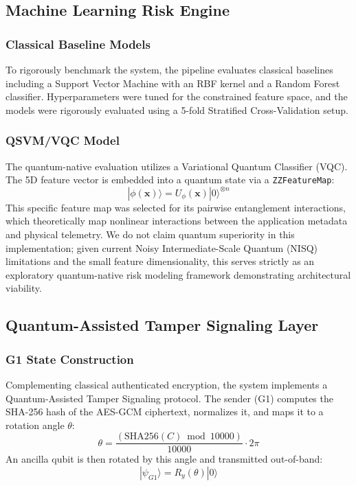 \subsection{Machine Learning Risk Engine}

\subsubsection{Classical Baseline Models}
To rigorously benchmark the system, the pipeline evaluates classical baselines including a Support Vector Machine with an RBF kernel and a Random Forest classifier. Hyperparameters were tuned for the constrained feature space, and the models were rigorously evaluated using a 5-fold Stratified Cross-Validation setup.

\subsubsection{QSVM/VQC Model}
The quantum-native evaluation utilizes a Variational Quantum Classifier (VQC). The 5D feature vector is embedded into a quantum state via a \texttt{ZZFeatureMap}:
\begin{equation}
|\phi(\mathbf{x})\rangle = U_\phi(\mathbf{x})|0\rangle^{\otimes n}
\end{equation}
This specific feature map was selected for its pairwise entanglement interactions, which theoretically map nonlinear interactions between the application metadata and physical telemetry. We do not claim quantum superiority in this implementation; given current Noisy Intermediate-Scale Quantum (NISQ) limitations and the small feature dimensionality, this serves strictly as an exploratory quantum-native risk modeling framework demonstrating architectural viability.

\subsection{Quantum-Assisted Tamper Signaling Layer}

\subsubsection{G1 State Construction}
Complementing classical authenticated encryption, the system implements a Quantum-Assisted Tamper Signaling protocol. The sender (G1) computes the SHA-256 hash of the AES-GCM ciphertext, normalizes it, and maps it to a rotation angle $\theta$:
\begin{equation}
\theta = \frac{(\mathrm{SHA256}(C) \bmod 10000)}{10000} \cdot 2\pi
\end{equation}
An ancilla qubit is then rotated by this angle and transmitted out-of-band:
\begin{equation}
|\psi_{G1}\rangle = R_y(\theta)|0\rangle
\end{equation}

